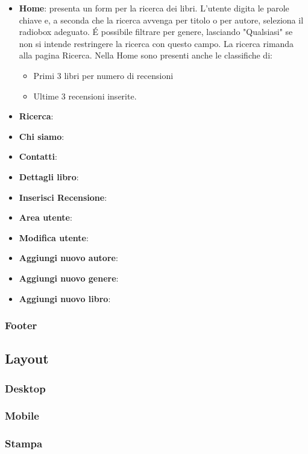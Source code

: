 \documentclass[12pt,a4paper,headings=optiontohead]{article}
\begin{document}
	\begin{itemize}
		\item \textbf{Home}: presenta un form per la ricerca dei libri. L'utente digita le parole chiave e, a seconda che la ricerca avvenga per titolo o per autore, seleziona il radiobox adeguato. \'E possibile filtrare per genere, lasciando "Qualsiasi" se non si intende restringere la ricerca con questo campo. La ricerca rimanda alla pagina Ricerca. Nella Home sono presenti anche le classifiche di:
		\begin{itemize}
			\item Primi 3 libri per numero di recensioni
			\item Ultime 3 recensioni inserite.
		\end{itemize} 
		\item \textbf{Ricerca}:
		\item \textbf{Chi siamo}:
		\item \textbf{Contatti}:
		\item \textbf{Dettagli libro}:
		\item \textbf{Inserisci Recensione}:
		\item \textbf{Area utente}:
		\item \textbf{Modifica utente}:
		\item \textbf{Aggiungi nuovo autore}:
		\item \textbf{Aggiungi nuovo genere}:
		\item \textbf{Aggiungi nuovo libro}:
	\end{itemize}
	
	
	
	
	
	
	\subsubsection{Footer}
	
	\subsection{Layout}
	\subsubsection{Desktop}
	\subsubsection{Mobile}
	\subsubsection{Stampa}
\end{document}
